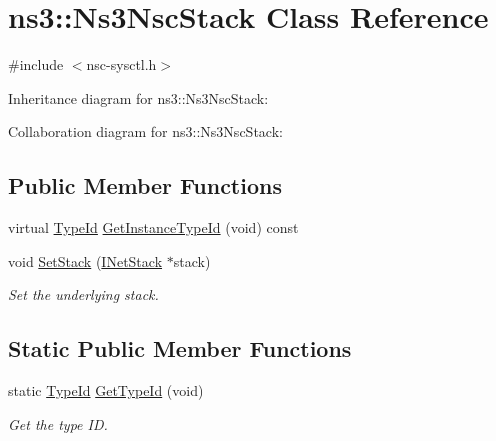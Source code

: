 \hypertarget{classns3_1_1Ns3NscStack}{}\section{ns3\+:\+:Ns3\+Nsc\+Stack Class Reference}
\label{classns3_1_1Ns3NscStack}


{\ttfamily \#include $<$nsc-\/sysctl.\+h$>$}



Inheritance diagram for ns3\+:\+:Ns3\+Nsc\+Stack\+:


Collaboration diagram for ns3\+:\+:Ns3\+Nsc\+Stack\+:
\subsection*{Public Member Functions}
\begin{DoxyCompactItemize}
\item 
virtual \hyperlink{classns3_1_1TypeId}{Type\+Id} \hyperlink{classns3_1_1Ns3NscStack_a3c33d8156d2b653b809a39f6590d509b}{Get\+Instance\+Type\+Id} (void) const 
\item 
void \hyperlink{classns3_1_1Ns3NscStack_a771e25aab7b58bdea6230c8f3b0c6800}{Set\+Stack} (\hyperlink{structINetStack}{I\+Net\+Stack} $\ast$stack)
\begin{DoxyCompactList}\small\item\em Set the underlying stack. \end{DoxyCompactList}\end{DoxyCompactItemize}
\subsection*{Static Public Member Functions}
\begin{DoxyCompactItemize}
\item 
static \hyperlink{classns3_1_1TypeId}{Type\+Id} \hyperlink{classns3_1_1Ns3NscStack_af7d0429052e042008d96c5b3fca3193d}{Get\+Type\+Id} (void)
\begin{DoxyCompactList}\small\item\em Get the type ID. \end{DoxyCompactList}\end{DoxyCompactItemize}
